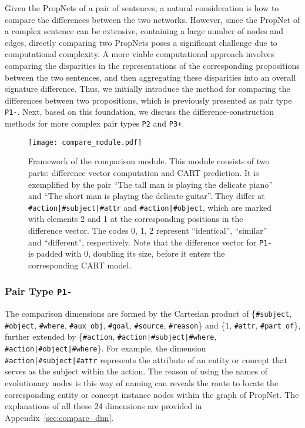 Given the PropNets of a pair of sentences, a natural consideration is how to compare the differences between the two networks. However, since the PropNet of a complex sentence can be extensive, containing a large number of nodes and edges, directly comparing two PropNets poses a significant challenge due to computational complexity. A more viable computational approach involves comparing the disparities in the representations of the corresponding propositions between the two sentences, and then aggregating these disparities into an overall signature difference. Thus, we initially introduce the method for comparing the differences between two propositions, which is previously presented as pair type \texttt{P1-}. Next, based on this foundation, we discuss the difference-construction methods for more complex pair types \texttt{P2} and \texttt{P3+}.

\begin{figure*}[h]
  \texttt{[image: compare\_module.pdf]}
  \centering
  \caption{Framework of the comparison module. This module consists of two parts: difference vector computation and CART prediction. It is exemplified by the pair ``The tall man is playing the delicate piano'' and ``The short man is playing the delicate guitar''. They differ at \texttt{\#action|\#subject|\#attr} and \texttt{\#action|\#object}, which are marked with elements 2 and 1 at the corresponding positions in the difference vector. The codes 0, 1, 2 represent ``identical'', ``similar'' and ``different'', respectively. Note that the difference vector for \texttt{P1-} is padded with 0, doubling its size, before it enters the corresponding CART model.}
  \label{fig:compare_module}
\end{figure*}

\subsubsection{Pair Type \texttt{P1-}}
\label{pair_type_p1}

The comparison dimensions are formed by the Cartesian product of \{\texttt{\#subject}, \texttt{\#object}, \texttt{\#where}, \texttt{\#aux\_obj}, \texttt{\#goal}, \texttt{\#source}, \texttt{\#reason}\} and \{$1$, \texttt{\#attr}, \texttt{\#part\_of}\}, further extended by \{\texttt{\#action}, \texttt{\#action|\#subject|\#where}, \texttt{\#action|\#object|\#where}\}. For example, the dimension \texttt{\#action|\#subject|\#attr} represents the attribute of an entity or concept that serves as the subject within the action. The reason of using the names of evolutionary nodes is this way of naming can reveals the route to locate the corresponding entity or concept instance nodes within the graph of PropNet. The explanations of all these 24 dimensions are provided in Appendix~\ref{sec:compare_dim}. 

